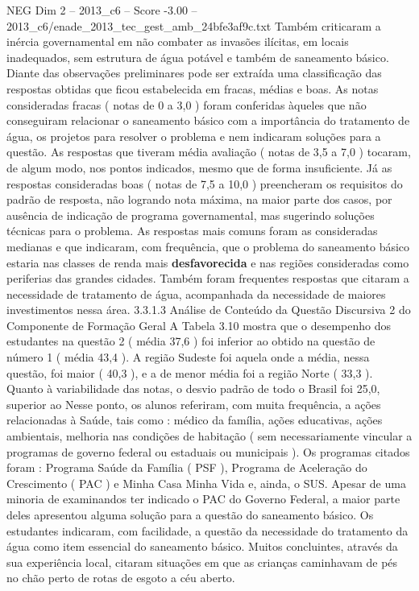 \begin{textsample}{NEG Dim 2 – 2013\_c6 – Score -3.00 – 2013\_c6/enade\_2013\_tec\_gest\_amb\_24bfe3af9c.txt}
Também criticaram a inércia governamental em não combater as invasões ilícitas, em locais inadequados, sem estrutura de água potável e também de saneamento básico.
Diante das observações preliminares pode ser extraída uma classificação das respostas obtidas que ficou estabelecida em fracas, médias e boas.
As notas consideradas fracas ( notas de 0 a 3,0 ) foram conferidas àqueles que não conseguiram relacionar o saneamento básico com a importância do tratamento de água, os projetos para resolver o problema e nem indicaram soluções para a questão.
As respostas que tiveram média avaliação ( notas de 3,5 a 7,0 ) tocaram, de algum modo, nos pontos indicados, mesmo que de forma insuficiente.
Já as respostas consideradas boas ( notas de 7,5 a 10,0 ) preencheram os requisitos do padrão de resposta, não logrando nota máxima, na maior parte dos casos, por ausência de indicação de programa governamental, mas sugerindo soluções técnicas para o problema.
As respostas mais comuns foram as consideradas medianas e que indicaram, com frequência, que o problema do saneamento básico estaria nas classes de renda mais \textbf{desfavorecida} e nas regiões consideradas como periferias das grandes cidades.
Também foram frequentes respostas que citaram a necessidade de tratamento de água, acompanhada da necessidade de maiores investimentos nessa área. 3.3.1.3 Análise de Conteúdo da Questão Discursiva 2 do Componente de Formação Geral A Tabela 3.10 mostra que o desempenho dos estudantes na questão 2 ( média 37,6 ) foi inferior ao obtido na questão de número 1 ( média 43,4 ).
A região Sudeste foi aquela onde a média, nessa questão, foi maior ( 40,3 ), e a de menor média foi a região Norte ( 33,3 ).
Quanto à variabilidade das notas, o desvio padrão de todo o Brasil foi 25,0, superior ao Nesse ponto, os alunos referiram, com muita frequência, a ações relacionadas à Saúde, tais como : médico da família, ações educativas, ações ambientais, melhoria nas condições de habitação ( sem necessariamente vincular a programas de governo federal ou estaduais ou municipais ).
Os programas citados foram : Programa Saúde da Família ( PSF ), Programa de Aceleração do Crescimento ( PAC ) e Minha Casa Minha Vida e, ainda, o SUS.
Apesar de uma minoria de examinandos ter indicado o PAC do Governo Federal, a maior parte deles apresentou alguma solução para a questão do saneamento básico.
Os estudantes indicaram, com facilidade, a questão da necessidade do tratamento da água como item essencial do saneamento básico.
Muitos concluintes, através da sua experiência local, citaram situações em que as crianças caminhavam de pés no chão perto de rotas de esgoto a céu aberto.

\end{textsample}
